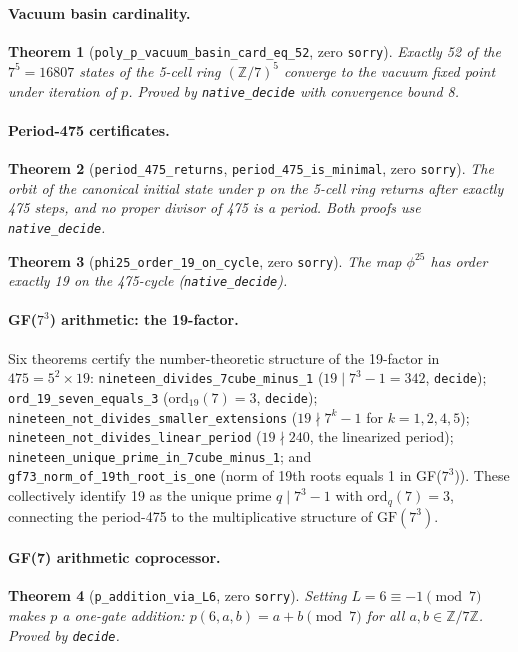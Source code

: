\documentclass[11pt,a4paper]{article}
\newtheorem{theorem}{Theorem}[section]
\theoremstyle{definition}
\begin{document}
\paragraph{Vacuum basin cardinality.}
\begin{theorem}[\lstinline|poly_p_vacuum_basin_card_eq_52|, zero \texttt{sorry}]
Exactly 52 of the $7^5=16807$ states of the 5-cell ring $(\mathbb{Z}/7)^5$ converge
to the vacuum fixed point under iteration of $p$.
Proved by \lstinline|native_decide| with convergence bound 8.
\end{theorem}

\paragraph{Period-475 certificates.}
\begin{theorem}[\lstinline|period_475_returns|, \lstinline|period_475_is_minimal|, zero \texttt{sorry}]
The orbit of the canonical initial state under $p$ on the 5-cell ring returns after
exactly 475 steps, and no proper divisor of 475 is a period.
Both proofs use \lstinline|native_decide|.
\end{theorem}

\begin{theorem}[\lstinline|phi25_order_19_on_cycle|, zero \texttt{sorry}]
The map $\phi^{25}$ has order exactly 19 on the 475-cycle (\lstinline|native_decide|).
\end{theorem}

\paragraph{GF($7^3$) arithmetic: the 19-factor.}
Six theorems certify the number-theoretic structure of the 19-factor in $475=5^2\times19$:
\lstinline|nineteen_divides_7cube_minus_1| ($19\mid 7^3-1=342$, \lstinline|decide|);
\lstinline|ord_19_seven_equals_3| ($\mathrm{ord}_{19}(7)=3$, \lstinline|decide|);
\lstinline|nineteen_not_divides_smaller_extensions| ($19\nmid 7^k-1$ for $k=1,2,4,5$);
\lstinline|nineteen_not_divides_linear_period| ($19\nmid 240$, the linearized period);
\lstinline|nineteen_unique_prime_in_7cube_minus_1|; and
\lstinline|gf73_norm_of_19th_root_is_one| (norm of 19th roots equals 1 in GF($7^3$)).
These collectively identify 19 as the unique prime $q\mid 7^3-1$ with $\mathrm{ord}_q(7)=3$,
connecting the period-475 to the multiplicative structure of $\mathrm{GF}(7^3)$.

\paragraph{GF(7) arithmetic coprocessor.}
\begin{theorem}[\lstinline|p_addition_via_L6|, zero \texttt{sorry}]
Setting $L=6\equiv -1\pmod{7}$ makes $p$ a one-gate addition:
$p(6,a,b) = a+b \pmod{7}$ for all $a,b\in\mathbb{Z}/7\mathbb{Z}$.
Proved by \lstinline|decide|.
\end{theorem}
\end{document}
